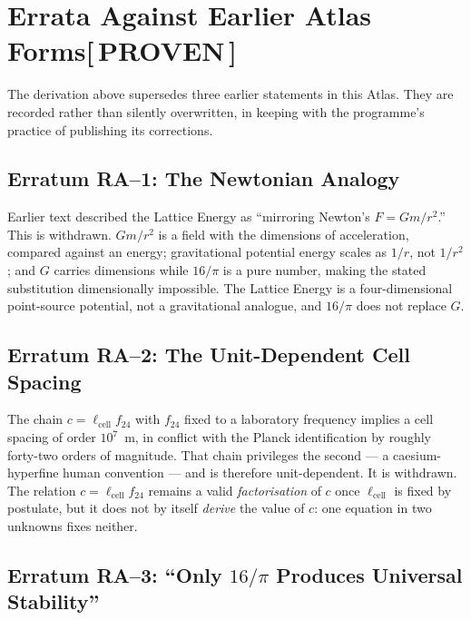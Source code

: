 \documentclass[12pt,oneside]{book}
\newcommand{\ProvenTag}{\;\colorbox{proventag!15}{\textcolor{proventag}{\footnotesize\bfseries [\,PROVEN\,]}}}
\begin{document}
\section{Errata Against Earlier Atlas Forms\ProvenTag}

The derivation above supersedes three earlier statements in this Atlas. They are
recorded rather than silently overwritten, in keeping with the programme's
practice of publishing its corrections.

\subsection{Erratum RA--1: The Newtonian Analogy}

Earlier text described the Lattice Energy as ``mirroring Newton's $F = Gm/r^2$.''
This is withdrawn. $Gm/r^2$ is a field with the dimensions of acceleration,
compared against an energy; gravitational potential energy scales as $1/r$, not
$1/r^2$; and $G$ carries dimensions while $16/\pi$ is a pure number, making the
stated substitution dimensionally impossible. The Lattice Energy is a
four-dimensional point-source potential, not a gravitational analogue, and
$16/\pi$ does not replace $G$.

\subsection{Erratum RA--2: The Unit-Dependent Cell Spacing}

The chain $c = \ell_{\text{cell}} f_{24}$ with $f_{24}$ fixed to a laboratory
frequency implies a cell spacing of order $10^7$~m, in conflict with the Planck
identification by roughly forty-two orders of magnitude. That chain privileges the
second --- a caesium-hyperfine human convention --- and is therefore
unit-dependent. It is withdrawn. The relation $c = \ell_{\text{cell}} f_{24}$
remains a valid \emph{factorisation} of $c$ once $\ell_{\text{cell}}$ is fixed by
postulate, but it does not by itself \emph{derive} the value of $c$: one equation
in two unknowns fixes neither.

\subsection{Erratum RA--3: ``Only $16/\pi$ Produces Universal Stability''}
\end{document}
